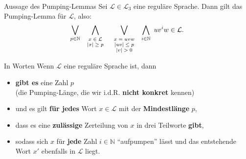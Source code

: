 \documentclass[]{beamer}
\begin{document}
\begin{frame}[squeeze]{}
  \begin{block}{Aussage des Pumping-Lemmas}
    Sei $\mathcal{L} \in \mathcal{L}_3$ eine reguläre Sprache. Dann gilt das Pumping-Lemma für $\mathcal{L}$, also:
    \[  \bigvee_{p \in \mathbb{N}}
      ~ 
        \bigwedge_{\begin{scriptsize} \begin{array}{c} x \in \mathcal{L} \\ |x| \geq p \end{array} \end{scriptsize}}
      ~
        \bigvee_{\begin{scriptsize} \begin{array}{c} x = uvw \\ |uv| \leq p \\ |v| > 0 \end{array} \end{scriptsize}}
      ~
        \bigwedge_{i \in \mathbb{N}}
      ~
        uv^iw \in \mathcal{L}. \]
  \end{block}
  
  \begin{exampleblock}{In Worten}
    Wenn $\mathcal{L}$ eine reguläre Sprache ist, dann
    \pause
    \begin{itemize}
      \item \textbf{gibt es} eine Zahl $p$ \\
            (die Pumping-Länge, die wir i.d.R. \textbf{nicht konkret} kennen)
      \pause
      \item und es gilt \textbf{für jedes} Wort $x \in \mathcal{L}$ mit der \textbf{Mindestlänge} $p$,
      \pause
      \item dass es eine \textbf{zulässige} Zerteilung von $x$ in drei Teilworte \textbf{gibt},
      \pause
      \item sodass sich $x$ für \textbf{jede} Zahl $i \in \mathbb{N}$ \enquote{aufpumpen} lässt und das entstehende Wort $x'$ ebenfalls in $\mathcal{L}$ liegt.
    \end{itemize}
  \end{exampleblock}
\end{frame}
\end{document}
